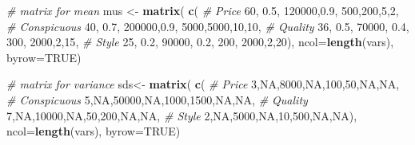 \documentclass[]{book}
\newenvironment{Shaded}{\begin{snugshade}}{\end{snugshade}}
\newcommand{\KeywordTok}[1]{\textcolor[rgb]{0.13,0.29,0.53}{\textbf{{#1}}}}
\newcommand{\DataTypeTok}[1]{\textcolor[rgb]{0.13,0.29,0.53}{{#1}}}
\newcommand{\DecValTok}[1]{\textcolor[rgb]{0.00,0.00,0.81}{{#1}}}
\newcommand{\FloatTok}[1]{\textcolor[rgb]{0.00,0.00,0.81}{{#1}}}
\newcommand{\StringTok}[1]{\textcolor[rgb]{0.31,0.60,0.02}{{#1}}}
\newcommand{\CommentTok}[1]{\textcolor[rgb]{0.56,0.35,0.01}{\textit{{#1}}}}
\newcommand{\OtherTok}[1]{\textcolor[rgb]{0.56,0.35,0.01}{{#1}}}
\newcommand{\NormalTok}[1]{{#1}}
\theoremstyle{definition}
\theoremstyle{definition}
\theoremstyle{remark}
\begin{document}
\begin{Shaded}
\begin{Highlighting}[]
\CommentTok{# matrix for mean}
\NormalTok{mus <-}\StringTok{ }\KeywordTok{matrix}\NormalTok{( }\KeywordTok{c}\NormalTok{(}
  \CommentTok{# Price}
  \DecValTok{60}\NormalTok{, }\FloatTok{0.5}\NormalTok{, }\DecValTok{120000}\NormalTok{,}\FloatTok{0.9}\NormalTok{, }\DecValTok{500}\NormalTok{,}\DecValTok{200}\NormalTok{,}\DecValTok{5}\NormalTok{,}\DecValTok{2}\NormalTok{,}
  \CommentTok{# Conspicuous}
  \DecValTok{40}\NormalTok{, }\FloatTok{0.7}\NormalTok{, }\DecValTok{200000}\NormalTok{,}\FloatTok{0.9}\NormalTok{, }\DecValTok{5000}\NormalTok{,}\DecValTok{5000}\NormalTok{,}\DecValTok{10}\NormalTok{,}\DecValTok{10}\NormalTok{,}
  \CommentTok{# Quality}
  \DecValTok{36}\NormalTok{, }\FloatTok{0.5}\NormalTok{, }\DecValTok{70000}\NormalTok{, }\FloatTok{0.4}\NormalTok{, }\DecValTok{300}\NormalTok{, }\DecValTok{2000}\NormalTok{,}\DecValTok{2}\NormalTok{,}\DecValTok{15}\NormalTok{,}
  \CommentTok{# Style}
  \DecValTok{25}\NormalTok{, }\FloatTok{0.2}\NormalTok{, }\DecValTok{90000}\NormalTok{, }\FloatTok{0.2}\NormalTok{, }\DecValTok{200}\NormalTok{, }\DecValTok{2000}\NormalTok{,}\DecValTok{2}\NormalTok{,}\DecValTok{20}\NormalTok{), }\DataTypeTok{ncol=}\KeywordTok{length}\NormalTok{(vars), }\DataTypeTok{byrow=}\OtherTok{TRUE}\NormalTok{)}
\end{Highlighting}
\end{Shaded}

\begin{Shaded}
\begin{Highlighting}[]
\CommentTok{# matrix for variance}
\NormalTok{sds<-}\StringTok{ }\KeywordTok{matrix}\NormalTok{( }\KeywordTok{c}\NormalTok{(}
  \CommentTok{# Price}
  \DecValTok{3}\NormalTok{,}\OtherTok{NA}\NormalTok{,}\DecValTok{8000}\NormalTok{,}\OtherTok{NA}\NormalTok{,}\DecValTok{100}\NormalTok{,}\DecValTok{50}\NormalTok{,}\OtherTok{NA}\NormalTok{,}\OtherTok{NA}\NormalTok{,}
  \CommentTok{# Conspicuous}
  \DecValTok{5}\NormalTok{,}\OtherTok{NA}\NormalTok{,}\DecValTok{50000}\NormalTok{,}\OtherTok{NA}\NormalTok{,}\DecValTok{1000}\NormalTok{,}\DecValTok{1500}\NormalTok{,}\OtherTok{NA}\NormalTok{,}\OtherTok{NA}\NormalTok{,}
  \CommentTok{# Quality}
  \DecValTok{7}\NormalTok{,}\OtherTok{NA}\NormalTok{,}\DecValTok{10000}\NormalTok{,}\OtherTok{NA}\NormalTok{,}\DecValTok{50}\NormalTok{,}\DecValTok{200}\NormalTok{,}\OtherTok{NA}\NormalTok{,}\OtherTok{NA}\NormalTok{,}
  \CommentTok{# Style}
  \DecValTok{2}\NormalTok{,}\OtherTok{NA}\NormalTok{,}\DecValTok{5000}\NormalTok{,}\OtherTok{NA}\NormalTok{,}\DecValTok{10}\NormalTok{,}\DecValTok{500}\NormalTok{,}\OtherTok{NA}\NormalTok{,}\OtherTok{NA}\NormalTok{), }\DataTypeTok{ncol=}\KeywordTok{length}\NormalTok{(vars), }\DataTypeTok{byrow=}\OtherTok{TRUE}\NormalTok{)}
\end{Highlighting}
\end{Shaded}
\end{document}
